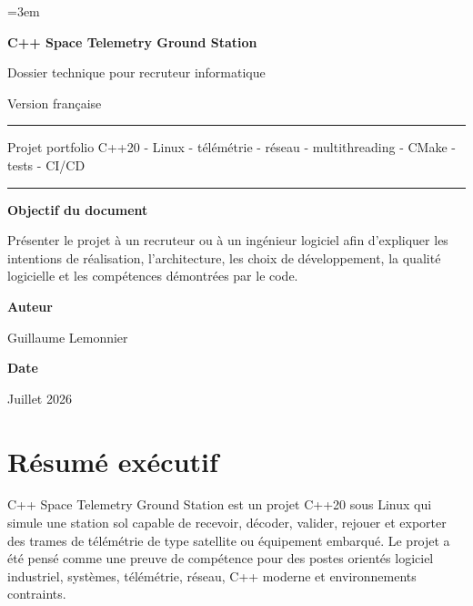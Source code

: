 \documentclass[11pt,a4paper]{article}
\newcommand{\projectname}{C++ Space Telemetry Ground Station}
\begin{document}
\sloppy
\emergencystretch=3em

\begin{titlepage}
    \centering
    \vspace*{1.8cm}
    {\Huge\bfseries\color{primary} \projectname \par}
    \vspace{0.5cm}
    {\Large Dossier technique pour recruteur informatique\par}
    \vspace{1.2cm}
    {\large Version française\par}
    \vspace{1.0cm}
    \rule{0.82\linewidth}{0.6pt}\par
    \vspace{0.6cm}
    {\large Projet portfolio C++20 - Linux - télémétrie - réseau - multithreading - CMake - tests - CI/CD\par}
    \vspace{0.6cm}
    \rule{0.82\linewidth}{0.6pt}\par
    \vfill
    \begin{flushleft}
    \textbf{Objectif du document}\par
    Présenter le projet à un recruteur ou à un ingénieur logiciel afin d'expliquer les intentions de réalisation, l'architecture, les choix de développement, la qualité logicielle et les compétences démontrées par le code.\par
    \vspace{0.7cm}
    \textbf{Auteur}\par
    Guillaume Lemonnier\par
    \vspace{0.3cm}
    \textbf{Date}\par
    Juillet 2026\par
    \end{flushleft}
\end{titlepage}

\tableofcontents
\newpage

\section{Résumé exécutif}

\projectname{} est un projet C++20 sous Linux qui simule une station sol capable de recevoir, décoder, valider, rejouer et exporter des trames de télémétrie de type satellite ou équipement embarqué. Le projet a été pensé comme une preuve de compétence pour des postes orientés logiciel industriel, systèmes, télémétrie, réseau, C++ moderne et environnements contraints.
\end{document}
